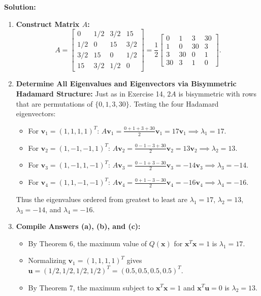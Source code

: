 \documentclass[11pt, letterpaper]{article}
\theoremstyle{definition}
\theoremstyle{remark}
\begin{document}
\textbf{Solution:}
\begin{enumerate}[label=\textbf{Step \arabic*:}]
    \item \textbf{Construct Matrix $A$:}
    \[
    A = \begin{bmatrix} 0 & 1/2 & 3/2 & 15 \\ 1/2 & 0 & 15 & 3/2 \\ 3/2 & 15 & 0 & 1/2 \\ 15 & 3/2 & 1/2 & 0 \end{bmatrix} = \frac{1}{2} \begin{bmatrix} 0 & 1 & 3 & 30 \\ 1 & 0 & 30 & 3 \\ 3 & 30 & 0 & 1 \\ 30 & 3 & 1 & 0 \end{bmatrix}.
    \]
    \item \textbf{Determine All Eigenvalues and Eigenvectors via Bisymmetric Hadamard Structure:}
    Just as in Exercise 14, $2A$ is bisymmetric with rows that are permutations of $\{0, 1, 3, 30\}$. Testing the four Hadamard eigenvectors:
    \begin{itemize}
        \item For $\mathbf{v}_1 = (1, 1, 1, 1)^T$: $A\mathbf{v}_1 = \frac{0 + 1 + 3 + 30}{2}\mathbf{v}_1 = 17\mathbf{v}_1 \implies \lambda_1 = 17$.
        \item For $\mathbf{v}_2 = (1, -1, -1, 1)^T$: $A\mathbf{v}_2 = \frac{0 - 1 - 3 + 30}{2}\mathbf{v}_2 = 13\mathbf{v}_2 \implies \lambda_2 = 13$.
        \item For $\mathbf{v}_3 = (1, -1, 1, -1)^T$: $A\mathbf{v}_3 = \frac{0 - 1 + 3 - 30}{2}\mathbf{v}_3 = -14\mathbf{v}_3 \implies \lambda_3 = -14$.
        \item For $\mathbf{v}_4 = (1, 1, -1, -1)^T$: $A\mathbf{v}_4 = \frac{0 + 1 - 3 - 30}{2}\mathbf{v}_4 = -16\mathbf{v}_4 \implies \lambda_4 = -16$.
    \end{itemize}
    Thus the eigenvalues ordered from greatest to least are $\lambda_1 = 17$, $\lambda_2 = 13$, $\lambda_3 = -14$, and $\lambda_4 = -16$.
    \item \textbf{Compile Answers (a), (b), and (c):}
    \begin{itemize}
        \item[(a)] By Theorem 6, the maximum value of $Q(\mathbf{x})$ for $\mathbf{x}^T\mathbf{x} = 1$ is $\lambda_1 = 17$.
        \item[(b)] Normalizing $\mathbf{v}_1 = (1, 1, 1, 1)^T$ gives $\mathbf{u} = (1/2, 1/2, 1/2, 1/2)^T = (0.5, 0.5, 0.5, 0.5)^T$.
        \item[(c)] By Theorem 7, the maximum subject to $\mathbf{x}^T\mathbf{x} = 1$ and $\mathbf{x}^T\mathbf{u} = 0$ is $\lambda_2 = 13$.
    \end{itemize}
\end{enumerate}
\end{document}
